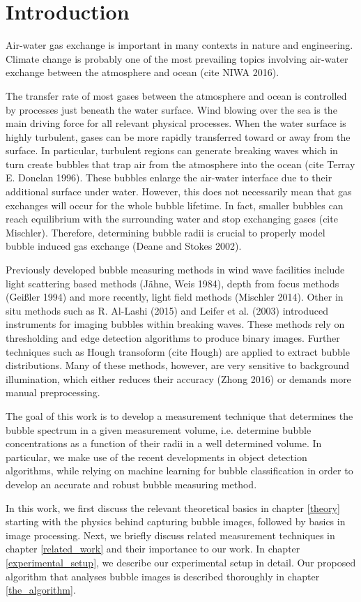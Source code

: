 \chapter{Introduction}
	Air-water gas exchange is important in many contexts in nature and engineering. Climate change is probably one of the most prevailing topics involving air-water exchange between the atmosphere and ocean (cite NIWA 2016). 
	
	The transfer rate of most gases between the atmosphere and ocean is controlled by processes just beneath the water surface. Wind blowing over the sea is the main driving force for all relevant physical processes. 
	When the water surface is highly turbulent, gases can be more rapidly transferred toward or away from the surface. In particular, turbulent regions can generate breaking waves which in turn create bubbles that trap air from the atmosphere into the ocean (cite Terray E. Donelan 1996). These bubbles enlarge the air-water interface due to their additional surface under water. However, this does not necessarily mean that gas exchanges will occur for the whole bubble lifetime. In fact, smaller bubbles can reach equilibrium with the surrounding water and stop exchanging gases (cite Mischler). Therefore, determining bubble radii is crucial to properly model bubble induced gas exchange (Deane and Stokes 2002).
	
	Previously developed bubble measuring methods in wind wave facilities include light scattering based methods (Jähne, Weis 1984), depth from focus methods (Geißler 1994) and more recently, light field methods (Mischler 2014). Other in situ methods such as R. Al-Lashi (2015) and Leifer et al. (2003) introduced instruments for imaging bubbles within breaking waves. These methods rely on thresholding and edge detection algorithms to produce binary images. Further techniques such as Hough transoform (cite Hough) are applied to extract bubble distributions. Many of these methods, however, are very sensitive to background illumination, which either reduces their accuracy (Zhong 2016) or demands more manual preprocessing.  
	
	The goal of this work is to develop a measurement technique that determines the bubble spectrum in a given measurement volume, i.e. determine bubble concentrations as a function of their radii in a well determined volume. In particular, we make use of the recent developments in object detection algorithms, while relying on machine learning for bubble classification in order to develop an accurate and robust bubble measuring method. 
	
	In this work, we first discuss the relevant theoretical basics in chapter \ref{theory} starting with the physics behind capturing bubble images, followed by basics in image processing. Next, we briefly discuss related measurement techniques in chapter \ref{related_work} and their importance to our work. In chapter \ref{experimental_setup}, we describe our experimental setup in detail. Our proposed algorithm that analyses bubble images is described thoroughly in chapter \ref{the_algorithm}. 